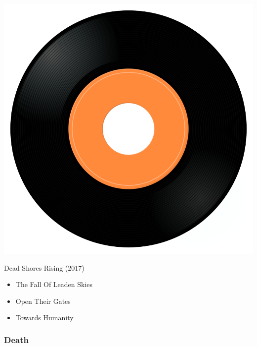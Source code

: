 \begin{minipage}[t]{0.25\textwidth}\vspace{0pt}
\captionsetup{type=figure}
\includegraphics[width=\textwidth]{Images/cover.png}
\caption*{Dead Shores Rising (2017)}
\end{minipage}
\begin{minipage}[t]{0.25\textwidth}\vspace{0pt}
\begin{itemize}[nosep,leftmargin=1em,labelwidth=*,align=left]
	\setlength{\itemsep}{0pt}
	\item The Fall Of Leaden Skies
	\item Open Their Gates
	\item Towards Humanity
\end{itemize}
\end{minipage}

\subsubsection{Death}

